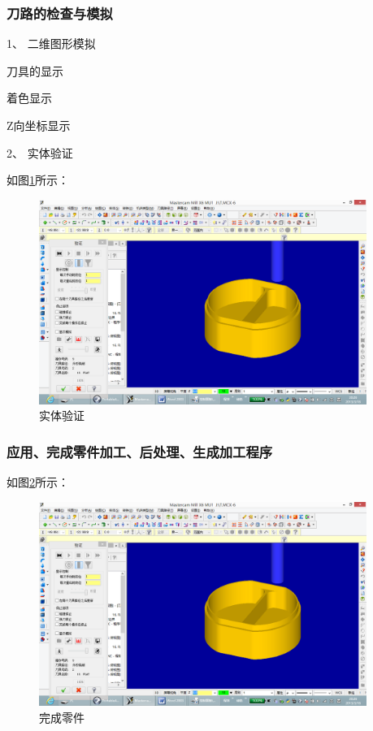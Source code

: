 \subsubsection{刀路的检查与模拟}
1、	二维图形模拟\par
刀具的显示\par
着色显示\par
Z向坐标显示\par
2、	实体验证\par
如图\ref{实体验证}所示：
\begin{figure}[!hbtp]
	\centering	\includegraphics[width=0.95\textwidth]{images/15-4}
	\caption{实体验证} \label{实体验证}
\end{figure}
\subsubsection{应用、完成零件加工、后处理、生成加工程序}
如图\ref{完成零件}所示：
\begin{figure}[!hbtp]
	\centering	\includegraphics[width=0.95\textwidth]{images/15-4}
	\caption{完成零件} \label{完成零件}
\end{figure}	
